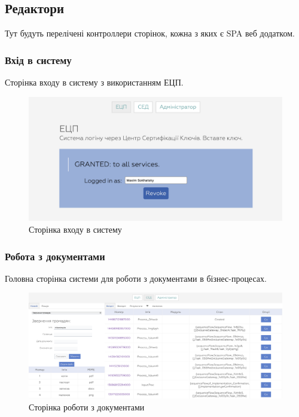 \newpage
\subsection{Редактори}

Тут будуть перелічені контроллери сторінок, кожна з яких є SPA веб додатком.

\subsubsection{Вхід в систему}

Сторінка входу в систему з використанням ЕЦП.

\begin{figure}[!htbp]
\centerline{\includegraphics[scale=0.4]{ldap.png}}
\caption{Сторінка входу в систему}
\end{figure}

\newpage
\subsubsection{Робота з документами}

Головна сторінка системи для роботи з документами в бізнес-процесах.

\begin{figure}[!htbp]
\centerline{\includegraphics[scale=0.2]{crm.png}}
\caption{Сторінка роботи з документами}
\end{figure}

